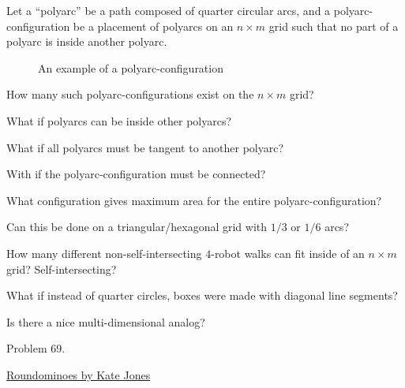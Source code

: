 \documentclass{article}
\begin{document}
Let a ``polyarc'' be a path composed of quarter circular arcs, and a polyarc-configuration be
a placement of polyarcs on an $n \times m$ grid such that no part of a polyarc is
inside another polyarc.
\begin{figure}[ht!]
  \centering
  \caption{
    An example of a polyarc-configuration
  }
\end{figure}
\begin{question}
  How many such polyarc-configurations exist on the $n \times m$ grid?
\end{question}

\begin{related}
  \item What if polyarcs can be inside other polyarcs?
  \item What if all polyarcs must be tangent to another polyarc?
  \item With if the polyarc-configuration must be connected?
  \item What configuration gives maximum area for the entire polyarc-configuration?
  \item Can this be done on a triangular/hexagonal grid with $1/3$ or $1/6$ arcs?
  \item How many different non-self-intersecting $4$-robot walks can fit inside
    of an $n \times m$ grid? Self-intersecting?
  \item What if instead of quarter circles, boxes were made with diagonal line
    segments?
  \item Is there a nice multi-dimensional analog?
\end{related}
\begin{references}
  \item Problem 69.
  \item \href{http://www.gamepuzzles.com/esspoly3.htm#SR}{Roundominoes by Kate Jones}
\end{references}
\end{document}
